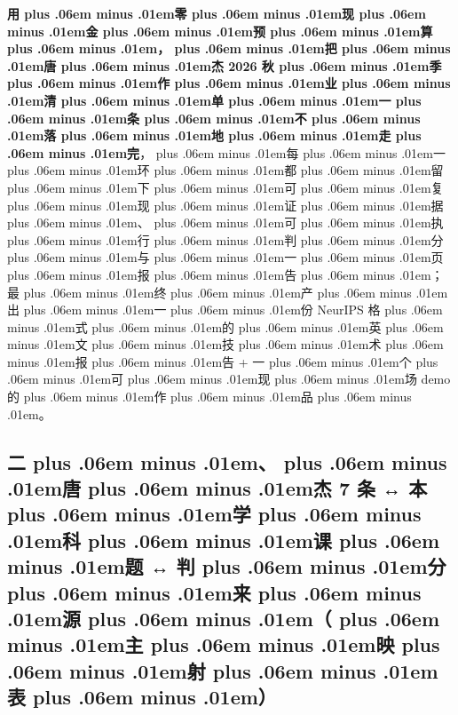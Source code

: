 \documentclass[
]{article}
\def\zh#1{{\zhfont #1}}
\def\sym#1{{\symfont #1}}
\def\zhglue{\hskip0pt plus .06em minus .01em}
\begin{document}
\textbf{\zh{用\zhglue 零\zhglue 现\zhglue 金\zhglue 预\zhglue 算\zhglue ，\zhglue 把\zhglue 唐\zhglue 杰} 2026 \zh{秋\zhglue 季\zhglue 作\zhglue 业\zhglue 清\zhglue 单\zhglue 一\zhglue 条\zhglue 不\zhglue 落\zhglue 地\zhglue 走\zhglue 完}}\zh{，\zhglue 每\zhglue 一\zhglue 环\zhglue 都\zhglue 留\zhglue 下\zhglue 可\zhglue 复\zhglue 现\zhglue 证\zhglue 据\zhglue 、\zhglue 可\zhglue 执\zhglue 行\zhglue 判\zhglue 分\zhglue 与\zhglue 一\zhglue 页\zhglue 报\zhglue 告\zhglue ；} \zh{最\zhglue 终\zhglue 产\zhglue 出\zhglue 一\zhglue 份} NeurIPS \zh{格\zhglue 式\zhglue 的\zhglue 英\zhglue 文\zhglue 技\zhglue 术\zhglue 报\zhglue 告} + \zh{一\zhglue 个\zhglue 可\zhglue 现\zhglue 场} demo \zh{的\zhglue 作\zhglue 品\zhglue 。}

\subsection{\zh{二\zhglue 、\zhglue 唐\zhglue 杰} 7 \zh{条} \sym{↔} \zh{本\zhglue 学\zhglue 科\zhglue 课\zhglue 题} \sym{↔} \zh{判\zhglue 分\zhglue 来\zhglue 源\zhglue （\zhglue 主\zhglue 映\zhglue 射\zhglue 表\zhglue ）}}\label{ux4e8cux5510ux6770-7-ux6761-ux672cux5b66ux79d1ux8bfeux9898-ux5224ux5206ux6765ux6e90ux4e3bux6620ux5c04ux8868}
\end{document}
